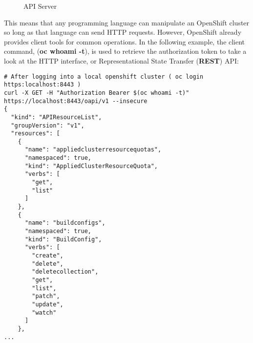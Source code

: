 \documentclass{article}
\begin{document}
\begin{figure}
\begin{tikzpicture}[node distance = 1cm and 0cm]

  
  
   

\end{tikzpicture}
\caption{API Server}
\end{figure}

This means that any programming language can manipulate an OpenShift cluster so long as that
language can send HTTP requests. However, OpenShift already provides client tools for 
common operations. In the following example, the client command, (\textbf{oc whoami -t}), is used to 
retrieve the authorization token to take a look at the HTTP interface, or Representational 
State Transfer (\textbf{REST}) API:    

\begin{lstlisting}
# After logging into a local openshift cluster ( oc login https:localhost:8443 )
curl -X GET -H "Authorization Bearer $(oc whoami -t)" https://localhost:8443/oapi/v1 --insecure
{
  "kind": "APIResourceList",
  "groupVersion": "v1",
  "resources": [
    {
      "name": "appliedclusterresourcequotas",
      "namespaced": true,
      "kind": "AppliedClusterResourceQuota",
      "verbs": [
        "get",
        "list"
      ]
    }, 
    {
      "name": "buildconfigs",
      "namespaced": true,
      "kind": "BuildConfig",
      "verbs": [
        "create",
        "delete",
        "deletecollection",
        "get",
        "list",
        "patch",
        "update",
        "watch"
      ]
    },
...
\end{lstlisting}


\end{document}
